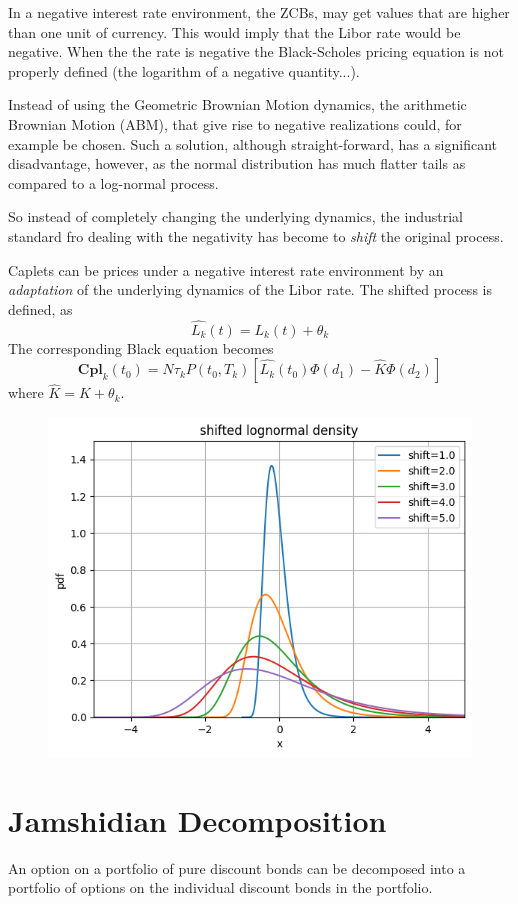 \documentclass[12pt,a4paper]{book}
\begin{document}
In a negative interest rate environment, the ZCBs, may get values that are higher than one unit of currency. This would imply that the Libor rate would be negative. When the the rate is negative the Black-Scholes pricing equation is not properly defined (the logarithm of a negative quantity...).

Instead of using the Geometric Brownian Motion dynamics, the arithmetic Brownian Motion (ABM), that give rise to negative realizations could, for example be chosen. Such a solution, although straight-forward, has a significant disadvantage, however, as the normal distribution has much flatter tails as compared to a log-normal process.

So instead of completely changing the underlying dynamics, the industrial standard fro dealing with the negativity has become to \emph{shift} the original process.

Caplets can be prices under a negative interest rate environment by an \emph{adaptation} of the underlying dynamics of the Libor rate. The shifted process is defined, as
\begin{equation}
\hat{L_k}(t) = L_k(t) + \theta_k
\end{equation}
The corresponding Black equation becomes
\begin{equation}
	\textbf{Cpl}_k(t_0) = N\tau_k P(t_0, T_k)\left[\hat{L_k}(t_0)\Phi(d_1)-\hat{K}\Phi(d_2)\right] 
\end{equation}
where $\hat{K} = K + \theta_k$.

\begin{figure}[htbp]
\begin{center}
	\includegraphics[width=0.6\linewidth]{addons/lognormal_shifted}
\end{center}
\label{fig:lognormal_shifted}
\end{figure}

\section{Jamshidian Decomposition}
An option on a portfolio of pure discount bonds can be decomposed into a portfolio of options on the individual discount bonds in the portfolio.
\end{document}
